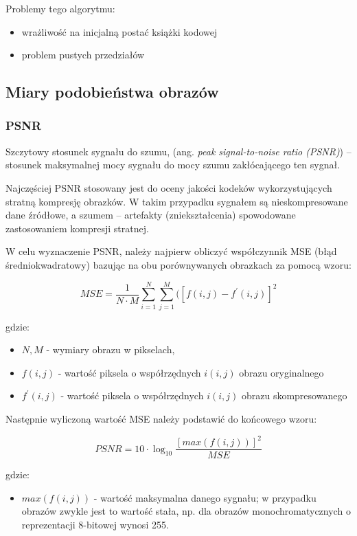 \documentclass{article}
\begin{document}
Problemy tego algorytmu:

\begin{itemize}
  \item wrażliwość na inicjalną postać książki kodowej
  \item problem pustych przedziałów
\end{itemize}

\subsection{Miary podobieństwa obrazów}

\subsubsection{PSNR}

Szczytowy stosunek sygnału do szumu, (ang. \emph{peak signal-to-noise ratio (PSNR)}) – stosunek maksymalnej mocy sygnału do mocy szumu zakłócającego ten sygnał.  

Najczęściej PSNR stosowany jest do oceny jakości kodeków wykorzystujących stratną kompresję obrazków. 
W takim przypadku sygnałem są nieskompresowane dane źródłowe, a szumem – artefakty (zniekształcenia) spowodowane zastosowaniem kompresji stratnej. 

W celu wyznaczenie PSNR, należy najpierw obliczyć współczynnik MSE (błąd średniokwadratowy) bazując na obu porównywanych obrazkach za pomocą wzoru:

\begin{equation}
  MSE = \frac{1}{N \cdot M} \sum_{i=1}^N \sum_{j=1}^M ([f(i, j) - f^{'}(i, j)]^2
\end{equation}

gdzie:
\begin{itemize}[label=]
  \item $N, M$ - wymiary obrazu w pikselach,
  \item $f(i, j)$ - wartość piksela o współrzędnych $i(i, j)$ obrazu oryginalnego
  \item $f^{'}(i, j)$ - wartość piksela o współrzędnych $i(i, j)$ obrazu skompresowanego
\end{itemize}

Następnie wyliczoną wartość MSE należy podstawić do końcowego wzoru: 

\begin{equation}
  PSNR = 10 \cdot \log_{10} \frac{[max(f(i,j))]^2}{MSE}
\end{equation}

gdzie:
\begin{itemize}[label=]
  \item $max(f(i,j))$ - wartość maksymalna danego sygnału; w przypadku obrazów zwykle jest to wartość stała,
        np. dla obrazów monochromatycznych o reprezentacji 8-bitowej wynosi 255.
\end{itemize}
\end{document}
